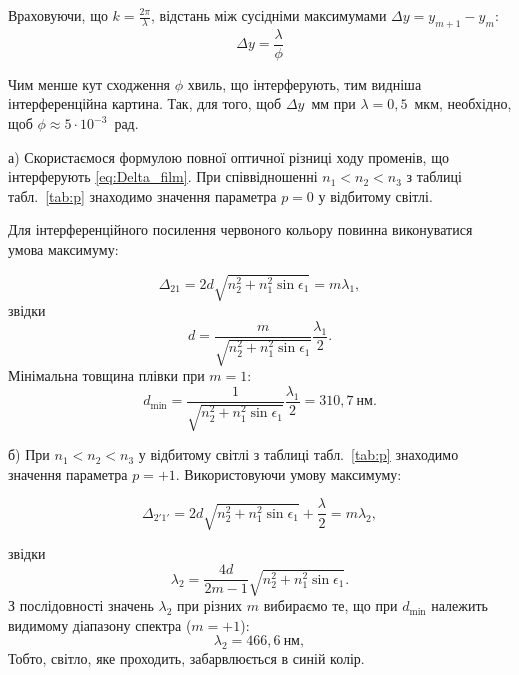 \begin{solutionexample}
	Враховуючи, що $k = \frac{2\pi}{\lambda}$, відстань між сусідніми максимумами $\Delta y = y_{m + 1} - y_m$:
	\begin{equation*}
		\Delta y = \frac{\lambda}{\phi}
	\end{equation*}

	Чим менше кут сходження $\phi$ хвиль, що інтерферують, тим
	видніша інтерференційна картина. Так, для того, щоб $  \Delta y $~мм при $ \lambda = 0,5 $~мкм, необхідно, щоб $\phi \approx 5 \cdot 10^{-3}$~рад.
\end{solutionexample}



\begin{solutionexample}
	а) Скористаємося формулою повної оптичної різниці ходу променів,
	що інтерферують \eqref{eq:Delta_film}. При співвідношенні $n_1 < n_2 < n_3$ з таблиці табл.~\ref{tab:p} знаходимо значення параметра $p = 0$ у відбитому світлі.

	Для інтерференційного посилення червоного кольору повинна
	виконуватися умова максимуму:

	\begin{equation*}
		\Delta_{21} = 2d\sqrt{n_2^2 + n_1^2\sin\epsilon_1} = m\lambda_1,
	\end{equation*}
	звідки
	\begin{equation*}
		d = \frac{m}{\sqrt{n_2^2 + n_1^2\sin\epsilon_1}}\frac{\lambda_1}{2}.
	\end{equation*}
	Мінімальна товщина плівки при $m = 1$:
	\begin{equation*}
		d_{\min} = \frac{1}{\sqrt{n_2^2 + n_1^2\sin\epsilon_1}}\frac{\lambda_1}{2} = 310,7\ \text{нм}.
	\end{equation*}

	\bigskip

	б) При $n_1 < n_2 < n_3$ у відбитому світлі з таблиці табл.~\ref{tab:p} знаходимо значення параметра $p = +1$. Використовуючи умову максимуму:

	\begin{equation*}
		\Delta_{2'1'} = 2d\sqrt{n_2^2 + n_1^2\sin\epsilon_1} + \frac\lambda2= m\lambda_2,
	\end{equation*}

	звідки
	\begin{equation*}
		\lambda_2 = \frac{4d}{2m-1}\sqrt{n_2^2 + n_1^2\sin\epsilon_1}.
	\end{equation*}
	З послідовності значень $\lambda_2$ при різних $m$ вибираємо те, що при $d_{\min} $ належить видимому діапазону спектра
	($m = +1$):
	\begin{equation*}
		\lambda_2 = 466,6\ \text{нм},
	\end{equation*}
	Тобто, світло, яке проходить, забарвлюється в синій колір.
\end{solutionexample}

